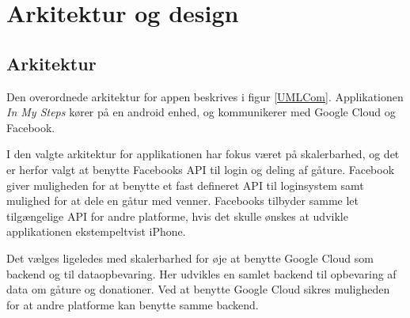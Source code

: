 \thispagestyle{fancy}
\chapter{Arkitektur og design}
\label{chp:description}

\section{Arkitektur}
Den overordnede arkitektur for appen beskrives i figur \ref{UMLCom}. Applikationen \emph{In My Steps} kører på en android enhed, og kommunikerer med Google Cloud og Facebook.

I den valgte arkitektur for applikationen har fokus været på skalerbarhed, og det er herfor valgt at benytte Facebooks API til login og deling af gåture. Facebook giver muligheden for at benytte et fast defineret API til loginsystem samt mulighed for at dele en gåtur med venner. Facebooks tilbyder samme let tilgængelige API for andre platforme, hvis det skulle ønskes at udvikle applikationen ekstempeltvist iPhone.

Det vælges ligeledes med skalerbarhed for øje at benytte Google Cloud som backend og til dataopbevaring. Her udvikles en samlet backend til opbevaring af data om gåture og donationer. Ved at benytte Google Cloud sikres muligheden for at andre platforme kan benytte samme backend. 

